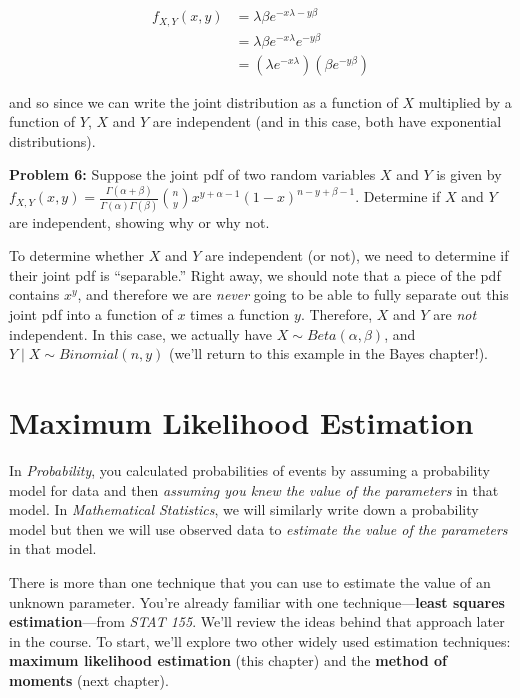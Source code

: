 \documentclass[
  letterpaper,
  DIV=11,
  numbers=noendperiod]{scrreprt}
\begin{document}
\begin{align*}    
f_{X,Y}(x,y) & = \lambda \beta e^{-x \lambda - y\beta} \\    
& = \lambda \beta e^{-x \lambda} e^{-y \beta} \\   
& = \left( \lambda  e^{-x \lambda} \right) \left( \beta e^{-y \beta} \right) 
\end{align*}

and so since we can write the joint distribution as a function of \(X\)
multiplied by a function of \(Y\), \(X\) and \(Y\) are independent (and
in this case, both have exponential distributions).

\textbf{Problem 6:} Suppose the joint pdf of two random variables \(X\)
and \(Y\) is given by
\(f_{X,Y}(x,y) = \frac{\Gamma(\alpha + \beta)}{\Gamma(\alpha) \Gamma(\beta)} \binom{n}{y} x^{y + \alpha - 1} (1-x)^{n-y + \beta - 1}\).
Determine if \(X\) and \(Y\) are independent, showing why or why not.

To determine whether \(X\) and \(Y\) are independent (or not), we need
to determine if their joint pdf is ``separable.'' Right away, we should
note that a piece of the pdf contains \(x^y\), and therefore we are
\emph{never} going to be able to fully separate out this joint pdf into
a function of \(x\) times a function \(y\). Therefore, \(X\) and \(Y\)
are \emph{not} independent. In this case, we actually have
\(X \sim Beta(\alpha, \beta)\), and \(Y \mid X \sim Binomial(n, y)\)
(we'll return to this example in the Bayes chapter!).


\hypertarget{maximum-likelihood-estimation}{%
\chapter{Maximum Likelihood
Estimation}\label{maximum-likelihood-estimation}}

In \emph{Probability}, you calculated probabilities of events by
assuming a probability model for data and then \emph{assuming you knew
the value of the parameters} in that model. In \emph{Mathematical
Statistics}, we will similarly write down a probability model but then
we will use observed data to \emph{estimate the value of the parameters}
in that model.

There is more than one technique that you can use to estimate the value
of an unknown parameter. You're already familiar with one
technique---\textbf{least squares estimation}---from \emph{STAT 155}.
We'll review the ideas behind that approach later in the course. To
start, we'll explore two other widely used estimation techniques:
\textbf{maximum likelihood estimation} (this chapter) and the
\textbf{method of moments} (next chapter).
\end{document}
